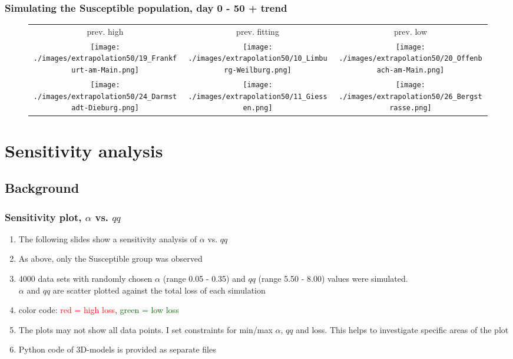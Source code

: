 \documentclass{beamer}
\begin{document}
\begin{frame}
	\frametitle{Simulating the Susceptible population, day 0 - 50 + trend}
	\begin{center}
		\begin{figure}
			\begin{adjustwidth}{-0.8cm}{}
			\begin{tabular}{ccc}
				prev. high & prev. fitting & prev. low \\
				\texttt{[image: ./images/extrapolation50/19\_Frankfurt-am-Main.png]}
					& \texttt{[image: ./images/extrapolation50/10\_Limburg-Weilburg.png]}
					& \texttt{[image: ./images/extrapolation50/20\_Offenbach-am-Main.png]} \\
				\texttt{[image: ./images/extrapolation50/24\_Darmstadt-Dieburg.png]}
					& \texttt{[image: ./images/extrapolation50/11\_Giessen.png]}
					& \texttt{[image: ./images/extrapolation50/26\_Bergstrasse.png]}
			\end{tabular}
			\end{adjustwidth}
		\end{figure}
	\end{center}
\end{frame}



\section{Sensitivity analysis}
\subsection{Background}
\begin{frame}
	\frametitle{Sensitivity plot, $\alpha$ vs. $qq$}
	\begin{enumerate}[$\bullet$]
		\item The following slides show a sensitivity analysis of $\alpha$ vs. $qq$
		\item As above, only the Susceptible group was observed
		\item 4000 data sets with randomly chosen $\alpha$ (range 0.05 - 0.35) and $qq$ (range 5.50 - 8.00) values were simulated.\\
			$\alpha$ and $qq$ are scatter plotted against the total loss of each simulation
		\item color code: \textcolor{red}{red = high loss}, \textcolor{darkgreen}{green = low loss}
		\item The plots may not show all data points. I set constraints for min/max $\alpha$, $qq$ and loss.
			This helps to investigate specific areas of the plot
		\item Python code of 3D-models is provided as separate files
	\end{enumerate}
\end{frame}
\end{document}
